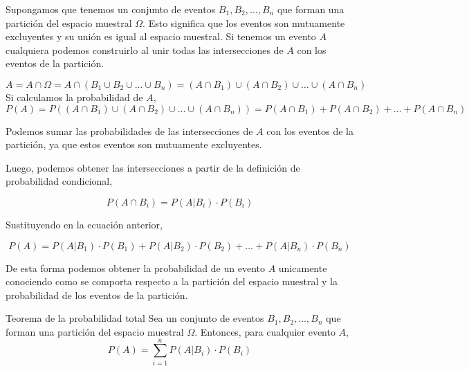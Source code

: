 Supongamos que tenemos un conjunto de eventos $B_1, B_2, \ldots, B_n$ que forman una partición del espacio muestral $\Omega$. Esto significa que los eventos son mutuamente excluyentes y su unión es igual al espacio muestral. Si tenemos un evento $A$ cualquiera podemos construirlo al unir todas las intersecciones de $A$ con los eventos de la partición. 

\[
  A = A \cap \Omega = A \cap (B_1 \cup B_2 \cup \ldots \cup B_n) = (A \cap B_1) \cup (A \cap B_2) \cup \ldots \cup (A \cap B_n)
\]
Si calculamos la probabilidad de $A$,
\[
  P(A) = P((A \cap B_1) \cup (A \cap B_2) \cup \ldots \cup (A \cap B_n)) = P(A \cap B_1) + P(A \cap B_2) + \ldots + P(A \cap B_n)
\]

\begin{nota}
  Podemos sumar las probabilidades de las intersecciones de $A$ con los eventos de la partición, ya que estos eventos son mutuamente excluyentes. 
\end{nota}

Luego, podemos obtener las intersecciones a partir de la definición de probabilidad condicional,

\[
  P(A \cap B_i) = P(A|B_i) \cdot P(B_i)
\]

Sustituyendo en la ecuación anterior,

\[
  P(A) = P(A|B_1) \cdot P(B_1) + P(A|B_2) \cdot P(B_2) + \ldots + P(A|B_n) \cdot P(B_n)
\]

De esta forma podemos obtener la probabilidad de un evento $A$ unicamente conociendo como se comporta respecto a la partición del espacio muestral y la probabilidad de los eventos de la partición. 

\begin{definicion}{Teorema de la probabilidad total}
  Sea un conjunto de eventos $B_1, B_2, \ldots, B_n$ que forman una partición del espacio muestral $\Omega$. Entonces, para cualquier evento $A$,
  \[
    P(A) = \sum_{i=1}^{n} P(A|B_i) \cdot P(B_i)
  \]
\end{definicion}




